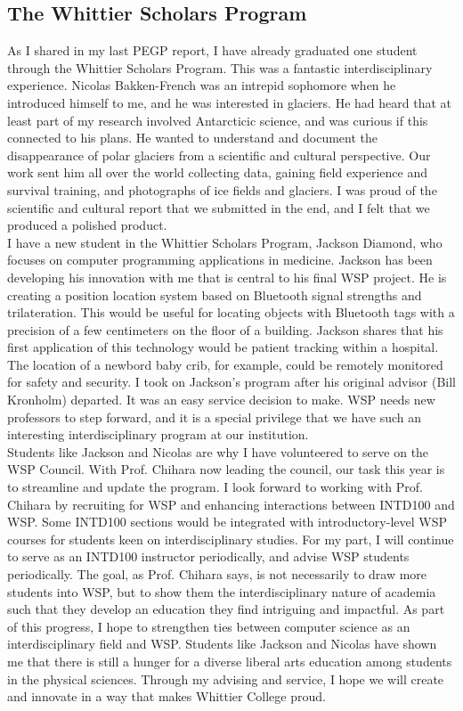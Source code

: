 \documentclass[../../../main.tex]{subfiles}
\begin{document}
\subsection{The Whittier Scholars Program}

As I shared in my last PEGP report, I have already graduated one student through the Whittier Scholars Program.  This was a fantastic interdisciplinary experience.  Nicolas Bakken-French was an intrepid sophomore when he introduced himself to me, and he was interested in glaciers.  He had heard that at least part of my research involved Antarcticic science, and was curious if this connected to his plans.  He wanted to understand and document the disappearance of polar glaciers from a scientific and cultural perspective.  Our work sent him all over the world collecting data, gaining field experience and survival training, and photographs of ice fields and glaciers.  I was proud of the scientific and cultural report that we submitted in the end, and I felt that we produced a polished product.
\\
\vspace{0.15cm}
I have a new student in the Whittier Scholars Program, Jackson Diamond, who focuses on computer programming applications in medicine.  Jackson has been developing his innovation with me that is central to his final WSP project.  He is creating a position location system based on Bluetooth signal strengths and trilateration.  This would be useful for locating objects with Bluetooth tags with a precision of a few centimeters on the floor of a building.  Jackson shares that his first application of this technology would be patient tracking within a hospital.  The location of a newbord baby crib, for example, could be remotely monitored for safety and security.  I took on Jackson's program after his original advisor (Bill Kronholm) departed.  It was an easy service decision to make.  WSP needs new professors to step forward, and it is a special privilege that we have such an interesting interdisciplinary program at our institution.
\\
\vspace{0.15cm}
Students like Jackson and Nicolas are why I have volunteered to serve on the WSP Council.  With Prof. Chihara now leading the council, our task this year is to streamline and update the program.  I look forward to working with Prof. Chihara by recruiting for WSP and enhancing interactions between INTD100 and WSP.  Some INTD100 sections would be integrated with introductory-level WSP courses for students keen on interdisciplinary studies.  For my part, I will continue to serve as an INTD100 instructor periodically, and advise WSP students periodically.  The goal, as Prof. Chihara says, is not necessarily to draw more students into WSP, but to show them the interdisciplinary nature of academia such that they develop an education they find intriguing and impactful.  As part of this progress, I hope to strengthen ties between computer science as an interdisciplinary field and WSP.  Students like Jackson and Nicolas have shown me that there is still a hunger for a diverse liberal arts education among students in the physical sciences.  Through my advising and service, I hope we will create and innovate in a way that makes Whittier College proud.
\end{document}
